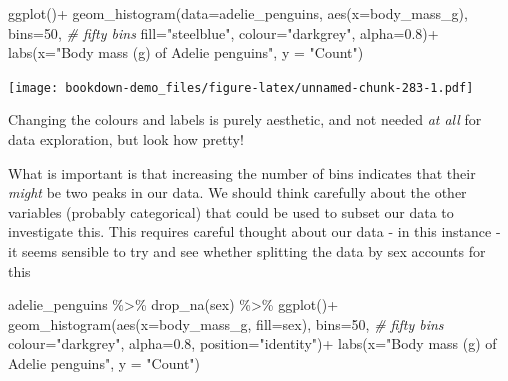 \documentclass[
]{book}
\newenvironment{Shaded}{\begin{snugshade}}{\end{snugshade}}
\newcommand{\AttributeTok}[1]{\textcolor[rgb]{0.77,0.63,0.00}{#1}}
\newcommand{\CommentTok}[1]{\textcolor[rgb]{0.56,0.35,0.01}{\textit{#1}}}
\newcommand{\DecValTok}[1]{\textcolor[rgb]{0.00,0.00,0.81}{#1}}
\newcommand{\FloatTok}[1]{\textcolor[rgb]{0.00,0.00,0.81}{#1}}
\newcommand{\FunctionTok}[1]{\textcolor[rgb]{0.00,0.00,0.00}{#1}}
\newcommand{\NormalTok}[1]{#1}
\newcommand{\SpecialCharTok}[1]{\textcolor[rgb]{0.00,0.00,0.00}{#1}}
\newcommand{\StringTok}[1]{\textcolor[rgb]{0.31,0.60,0.02}{#1}}
\begin{document}
\begin{Shaded}
\begin{Highlighting}[]
\FunctionTok{ggplot}\NormalTok{()}\SpecialCharTok{+}
  \FunctionTok{geom\_histogram}\NormalTok{(}\AttributeTok{data=}\NormalTok{adelie\_penguins,}
                 \FunctionTok{aes}\NormalTok{(}\AttributeTok{x=}\NormalTok{body\_mass\_g),}
                 \AttributeTok{bins=}\DecValTok{50}\NormalTok{, }\CommentTok{\# fifty bins}
                 \AttributeTok{fill=}\StringTok{"steelblue"}\NormalTok{,}
                 \AttributeTok{colour=}\StringTok{"darkgrey"}\NormalTok{,}
                 \AttributeTok{alpha=}\FloatTok{0.8}\NormalTok{)}\SpecialCharTok{+}
  \FunctionTok{labs}\NormalTok{(}\AttributeTok{x=}\StringTok{"Body mass (g) of Adelie penguins"}\NormalTok{,}
       \AttributeTok{y =} \StringTok{"Count"}\NormalTok{)}
\end{Highlighting}
\end{Shaded}

\texttt{[image: bookdown-demo\_files/figure-latex/unnamed-chunk-283-1.pdf]}

Changing the colours and labels is purely aesthetic, and not needed \emph{at all} for data exploration, but look how pretty!

What is important is that increasing the number of bins indicates that their \emph{might} be two peaks in our data. We should think carefully about the other variables (probably categorical) that could be used to subset our data to investigate this. This requires careful thought about our data - in this instance - it seems sensible to try and see whether splitting the data by sex accounts for this

\begin{Shaded}
\begin{Highlighting}[]
\NormalTok{adelie\_penguins }\SpecialCharTok{\%\textgreater{}\%} 
  \FunctionTok{drop\_na}\NormalTok{(sex) }\SpecialCharTok{\%\textgreater{}\%} 
\FunctionTok{ggplot}\NormalTok{()}\SpecialCharTok{+}
  \FunctionTok{geom\_histogram}\NormalTok{(}\FunctionTok{aes}\NormalTok{(}\AttributeTok{x=}\NormalTok{body\_mass\_g,}
                     \AttributeTok{fill=}\NormalTok{sex),}
                 \AttributeTok{bins=}\DecValTok{50}\NormalTok{, }\CommentTok{\# fifty bins}
                 \AttributeTok{colour=}\StringTok{"darkgrey"}\NormalTok{,}
                 \AttributeTok{alpha=}\FloatTok{0.8}\NormalTok{,}
                 \AttributeTok{position=}\StringTok{"identity"}\NormalTok{)}\SpecialCharTok{+}
  \FunctionTok{labs}\NormalTok{(}\AttributeTok{x=}\StringTok{"Body mass (g) of Adelie penguins"}\NormalTok{,}
       \AttributeTok{y =} \StringTok{"Count"}\NormalTok{)}
\end{Highlighting}
\end{Shaded}
\end{document}

